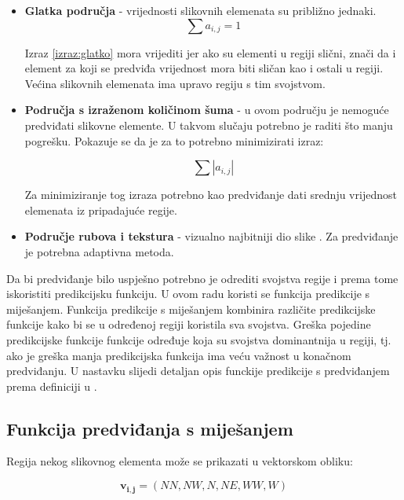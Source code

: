 \documentclass[times, utf8, zavrsni, numeric, sort]{fer}
\begin{document}
\begin{itemize}
\item \textbf{Glatka područja} - vrijednosti slikovnih elemenata su približno jednaki.
\begin{equation}
\label{izraz:glatko}
\sum a_{i,j} = 1
\end{equation}

Izraz \ref{izraz:glatko} mora vrijediti jer ako su elementi u regiji slični, znači da i element za koji se predviđa vrijednost mora biti sličan kao i ostali u regiji. Većina slikovnih elemenata ima upravo regiju s tim svojstvom.

\item \textbf{Područja s izraženom količinom šuma} - u ovom području je nemoguće predviđati slikovne elemente. U takvom slučaju potrebno je raditi što manju pogrešku. Pokazuje se da je za to potrebno minimizirati izraz:

\begin{equation}
\sum |a_{i,j}|
\end{equation}

Za minimiziranje tog izraza potrebno kao predviđanje dati srednju vrijednost elemenata iz pripadajuće regije.

\item \textbf{Područje rubova i tekstura} - vizualno najbitniji dio slike \cite{Seemann:97}. Za predviđanje je potrebna adaptivna metoda.

\end{itemize}

Da bi predviđanje bilo uspješno potrebno je odrediti svojstva regije i prema tome iskoristiti predikcijsku funkciju. U ovom radu koristi se funkcija predikcije s miješanjem. Funkcija predikcije s miješanjem kombinira različite predikcijske funkcije kako bi se u određenoj regiji koristila sva svojstva. Greška pojedine predikcijske funkcije funkcije određuje koja su svojstva dominantnija u regiji, tj. ako je greška manja predikcijska funkcija ima veću važnost u konačnom predviđanju. U nastavku slijedi detaljan opis funckije predikcije s predviđanjem prema definiciji u \cite{Knezovic:06}.

\subsection{Funkcija predviđanja s miješanjem }

Regija nekog slikovnog elementa može se prikazati u vektorskom obliku:

\begin{equation}
\mathbf{v_{i,j}}=(NN, NW, N, NE, WW, W)
\end{equation}
\end{document}
